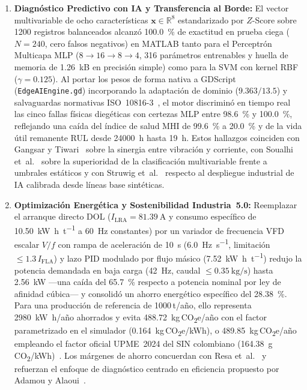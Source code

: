\begin{enumerate}
  \item \textbf{Diagn\'ostico Predictivo con IA y Transferencia al Borde:} El
  vector multivariable de ocho caracter\'isticas $\mathbf{x}\in\mathbb{R}^8$
  estandarizado por $Z$-Score sobre \num{1200} registros balanceados alcanz\'o
  \qty{100.0}{\percent} de exactitud en prueba ciega ($N=240$, cero falsos
  negativos) en MATLAB tanto para el Perceptr\'on Multicapa MLP
  ($8\to 16\to 8\to 4$, 316 par\'ametros entrenables y huella de memoria de
  \qty{1.26}{kB} en precisi\'on simple) como para la SVM con kernel RBF
  ($\gamma=0.125$). Al portar los pesos de forma nativa a GDScript
  (\texttt{EdgeAIEngine.gd}) incorporando la adaptaci\'on de dominio
  ($9.363/13.5$) y salvaguardas normativas ISO~10816-3~\cite{ISO10816,ISO20816},
  el motor discrimin\'o en tiempo real las cinco fallas f\'isicas dieg\'eticas
  con certezas MLP entre \qty{98.6}{\percent} y \qty{100.0}{\percent},
  reflejando una ca\'ida del \'indice de salud MHI de \qty{99.6}{\percent} a
  \qty{20.0}{\percent} y de la vida \'util remanente RUL desde
  \qty{24000}{\hour} hasta \qty{19}{\hour}. Estos hallazgos coinciden con
  Gangsar y Tiwari~\cite{Gangsar2020} sobre la sinergia entre vibraci\'on y
  corriente, con Soualhi et~al.~\cite{Soualhi2022} sobre la superioridad de la
  clasificaci\'on multivariable frente a umbrales est\'aticos y con Struwig
  et~al.~\cite{AI2026} respecto al despliegue industrial de IA calibrada desde
  l\'ineas base sint\'eticas.

  \item \textbf{Optimizaci\'on Energ\'etica y Sostenibilidad Industria~5.0:}
  Reemplazar el arranque directo DOL ($I_{\mathrm{LRA}}=\qty{81.39}{\ampere}$ y
  consumo espec\'ifico de \qty{10.50}{\kilo\watt\hour\per\tonne} a
  \qty{60}{\hertz} constantes) por un variador de frecuencia VFD escalar $V/f$
  con rampa de aceleraci\'on de \qty{10}{\second} (\qty{6.0}{\hertz\per\second},
  limitaci\'on $\le 1.3\,I_{\mathrm{FLA}}$) y lazo PID modulado por flujo
  m\'asico (\qty{7.52}{\kilo\watt\hour\per\tonne}) redujo la potencia demandada
  en baja carga (\qty{42}{\hertz}, caudal $\le\qty{0.35}{\kilogram\per\second}$)
  hasta \qty{2.56}{\kilo\watt} ---una ca\'ida del \qty{65.7}{\percent} respecto
  a potencia nominal por ley de afinidad c\'ubica--- y consolid\'o un ahorro
  energ\'etico espec\'ifico del \qty{28.38}{\percent}. Para una producci\'on de
  referencia de \num{1000}\,t/a\~no, ello representa
  \qty{2980}{\kilo\watt\hour}/a\~no ahorrados y evita
  \qty{488.72}{\kilogram}\,CO\textsubscript{2}e/a\~no con el factor
  parametrizado en el simulador (\qty{0.164}{\kilogram}\,CO\textsubscript{2}e/kWh),
  o \qty{489.85}{\kilogram}\,CO\textsubscript{2}e/a\~no empleando el factor
  oficial UPME~2024 del SIN colombiano
  (\qty{164.38}{\gram}\,CO\textsubscript{2}/kWh)~\cite{UPME2024}. Los m\'argenes
  de ahorro concuerdan con Resa et~al.~\cite{Resa2019} y refuerzan el enfoque
  de diagn\'ostico centrado en eficiencia propuesto por Adamou y
  Alaoui~\cite{Adamou2024}.


\end{enumerate}
